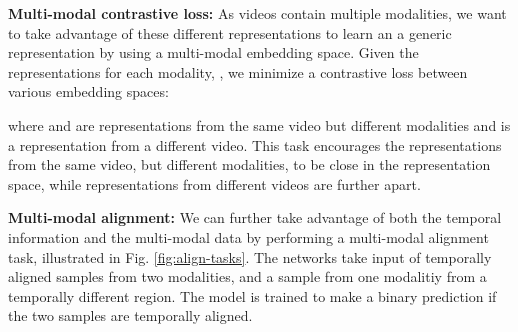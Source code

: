 \documentclass[10pt,twocolumn,letterpaper]{article}
\begin{document}
\textbf{Multi-modal contrastive loss:} As videos contain multiple modalities, we want to take advantage of these different representations to learn an a generic representation by using a multi-modal embedding space. Given the representations for each modality, , we minimize a contrastive loss between various embedding spaces:

where  and  are representations from the same video but different modalities and  is a representation from a different video.
This task encourages the representations from the same video, but different modalities, to be close in the representation space, while representations from different videos are further apart.


\textbf{Multi-modal alignment:} We can further take advantage of both the temporal information and the multi-modal data by performing a multi-modal alignment task, illustrated in Fig. \ref{fig:align-tasks}. The networks take input of temporally aligned samples from two modalities, and a sample from one modalitiy from a temporally different region. The model is trained to make a binary prediction if the two samples are temporally aligned.
\end{document}
